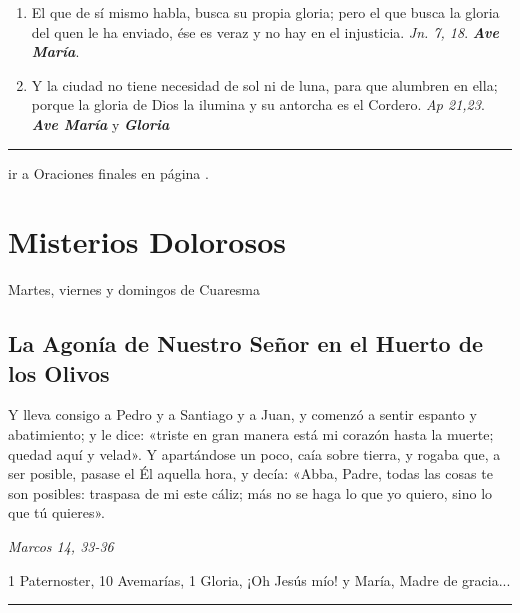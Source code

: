 \documentclass[11pt,a4paper]{book}
\begin{document}
\begin{enumerate}
        \item El que de sí mismo habla, busca su propia gloria; pero el que busca la gloria del quen le ha enviado, ése es veraz y no hay en el injusticia.
             \emph{Jn. 7, 18}. \textbf{\emph{Ave María}}.

        \item Y la ciudad no tiene necesidad de sol ni de luna, para que alumbren en ella; porque la gloria de Dios la ilumina y su antorcha es el Cordero. 
            \emph{Ap 21,23}. \textbf{\emph{Ave María}} y \textbf{\emph{Gloria}}
    
    \end{enumerate}    

    \rule{\textwidth}{0.5pt}
    

    ir a Oraciones finales en página \pageref{sec:final-prayer}.

    \newpage    

    \section*{Misterios Dolorosos}
    Martes, viernes y domingos de Cuaresma

    \subsection*{La Agonía de Nuestro Señor en el Huerto de los Olivos}
    
    Y lleva consigo a Pedro y a Santiago y a Juan, y comenzó a sentir espanto y abatimiento; y le dice: 
    «triste en gran manera está mi corazón hasta la muerte; quedad aquí y velad». Y apartándose un poco, 
    caía sobre tierra, y rogaba que, a ser posible, pasase el Él aquella hora, y decía: «Abba, Padre, todas las cosas te son posibles: 
    traspasa de mi este cáliz; más no se haga lo que yo quiero, sino lo que tú quieres».
    
    \begin{flushright}
        \emph{Marcos 14, 33-36}
    \end{flushright}
    
    1 Paternoster, 10 Avemarías, 1 Gloria, ¡Oh Jesús mío! y María, Madre de gracia...

    \rule{\textwidth}{0.5pt}
\end{document}
